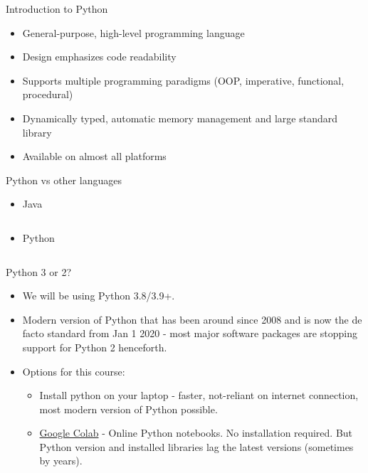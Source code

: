 \documentclass[aspectratio=169]{beamer}
\begin{document}
    \begin{frame}{Introduction to Python}
        \begin{itemize}
            \item General-purpose, high-level programming language
            \item Design emphasizes code readability
            \item Supports multiple programming paradigms (OOP, imperative, functional, procedural)
            \item Dynamically typed, automatic memory management and large standard library
            \item Available on almost all platforms
        \end{itemize}

    \end{frame}


    \begin{frame}[fragile]{Python vs other languages}
        \begin{itemize}
            \item Java
            \inputminted{java}{example_hello_world_java.java}
            \item Python
            \inputminted{python}{example_hello_world_python.py}
        \end{itemize}
    \end{frame}

    \begin{frame}{Python 3 or 2?}
        \begin{itemize}
            \item We will be using Python 3.8/3.9+.
            \item Modern version of Python that has been around since 2008 and is now the de facto standard from Jan 1 2020 - most major software packages are stopping support for Python 2 henceforth.
            \item Options for this course:
            \begin{itemize}
                \item Install python on your laptop - faster, not-reliant on internet connection, most modern version of Python possible.
                \item \href{https://colab.research.google.com/}{Google Colab} - Online Python notebooks. No installation required. But Python version and installed libraries lag the latest versions (sometimes by years).
            \end{itemize}
        \end{itemize}
    \end{frame}
\end{document}
